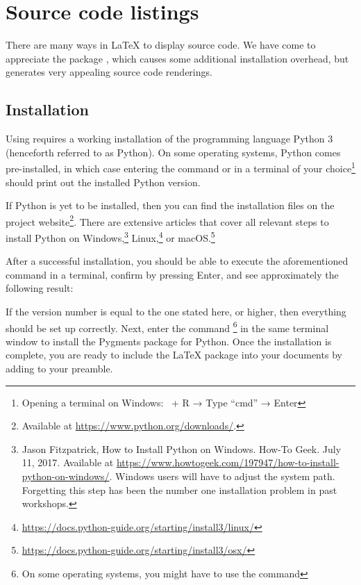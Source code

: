 \chapter{Source code listings}
\label{sec:source-code-listings}

There are many ways in \LaTeX{} to display source code.
We have come to appreciate the package , which causes some additional installation overhead, but generates very appealing source code renderings.

\section{Installation}
Using  requires a working installation of the programming language Python 3 (henceforth referred to as Python).
On some operating systems, Python comes pre-installed, in which case entering the command  or  in a terminal of your choice\footnote{Opening a terminal on Windows: \faWindows\ + R → Type \enquote{cmd} → Enter} should print out the installed Python version.

If Python is yet to be installed, then you can find the installation files on the project website\footnote{Available at \url{https://www.python.org/downloads/}.}.
There are extensive articles that cover all relevant steps to install Python on 
Windows,\footnote{Jason Fitzpatrick, How to Install Python on Windows. How-To 
Geek. July 11, 2017. Available at 
\url{https://www.howtogeek.com/197947/how-to-install-python-on-windows/}. 
Windows users will have to adjust the system path. Forgetting this step has 
been the number one installation problem in past workshops.} 
Linux,\footnote{\url{https://docs.python-guide.org/starting/install3/linux/}} 
or macOS.\footnote{\url{https://docs.python-guide.org/starting/install3/osx/}}

After a successful installation, you should be able to execute the aforementioned command in a terminal, confirm by pressing Enter, and see approximately the following result: 


\noindent If the version number is equal to the one stated here, or higher, then everything should be set up correctly.
Next, enter the command \footnote{On some operating systems, you might have to use the command } in the same terminal window to install the Pygments package for Python.
Once the installation is complete, you are ready to include the \LaTeX{} package  into your documents by adding  to your preamble.


